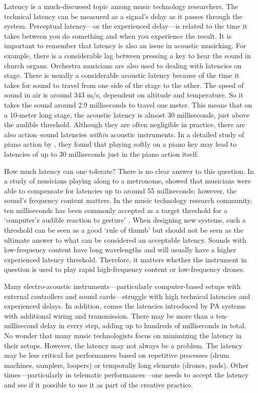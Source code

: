 Latency is a much-discussed topic among music technology researchers. The technical latency can be measured as a signal's delay as it passes through the system. Perceptual latency---or the experienced delay---is related to the time it takes between you do something and when you experience the result. It is important to remember that latency is also an issue in acoustic musicking. For example, there is a considerable lag between pressing a key to hear the sound in church organs. Orchestra musicians are also used to dealing with latencies on stage. There is usually a considerable acoustic latency because of the time it takes for sound to travel from one side of the stage to the other. The speed of sound in air is around 343 m/s, dependent on altitude and temperature. So it takes the sound around 2.9 milliseconds to travel one meter. This means that on a 10-meter long stage, the acoustic latency is almost 30 milliseconds, just above the audible threshold.
Although they are often negligible in practice, there are also action--sound latencies \emph{within} acoustic instruments. In a detailed study of piano action by \citet{askenfelt_touch_1990}, they found that playing softly on a piano key may lead to latencies of up to 30 milliseconds just in the piano action itself.

How much latency can one tolerate? There is no clear answer to this question.
In a study of musicians playing along to a metronome, \citet{dahl_is_2001} showed that musicians were able to compensate for latencies up to around 55 milliseconds; however, the sound's frequency content matters. In the music technology research community, ten milliseconds has been commonly accepted as a target threshold for a `computer’s audible reaction to gesture' \citep[p.13]{wessel_problems_2001}. When designing new systems, such a threshold can be seen as a good `rule of thumb' but should not be seen as the ultimate answer to what can be considered an acceptable latency. Sounds with low-frequency content have long wavelengths and will usually have a higher experienced latency threshold. Therefore, it matters whether the instrument in question is used to play rapid high-frequency content or low-frequency drones.

Many electro-acoustic instruments---particularly computer-based setups with external controllers and sound cards---struggle with high technical latencies and experienced delays. In addition, comes the latencies introduced by PA systems with additional wiring and transmission. There may be more than a ten-millisecond delay in every step, adding up to hundreds of milliseconds in total. No wonder that many music technologists focus on minimizing the latency in their setups. However, the latency may not always be a problem. The latency may be less critical for performances based on repetitive processes (drum machines, samplers, loopers) or temporally long elements (drones, pads). Other times---particularly in telematic performances---one needs to accept the latency and see if it possible to use it as part of the creative practice.


